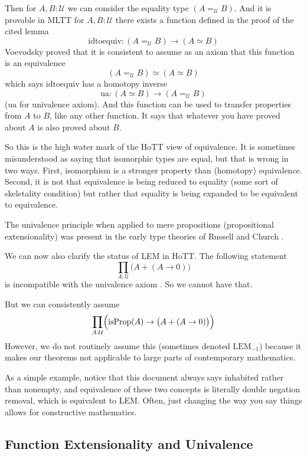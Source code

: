 \documentclass[11pt]{article}
\DeclareMathOperator{\isProp}{isProp}
\newcommand{\universe}{\mathcal{U}}
\begin{document}
Then for $A, B : \universe$ we can consider the equality
type $(A =_\universe B)$.  And it is provable in MLTT
 for $A, B : \universe$ there
exists a function defined in the proof of the cited lemma
$$
   \text{idtoequiv} : (A =_\universe B) \to (A \simeq B)
$$
Voevodsky proved that it is consistent to assume as an axiom that this
function is an equivalence
$$
   (A =_\universe B) \simeq (A \simeq B)
$$
which says $\text{idtoequiv}$ has a homotopy inverse
$$
   \text{ua} : (A \simeq B) \to (A =_\universe B)
$$
($\text{ua}$ for univalence axiom).  And this function can be used to
transfer properties from $A$ to $B$, like any other function.
It says that whatever you have proved about $A$ is also proved about $B$.

So this is the high water mark of the HoTT view of equivalence.  It
is sometimes misunderstood as saying that isomorphic types are equal,
but that is wrong in two ways.  First, isomorphism is a stronger property
than (homotopy) equivalence.  Second, it is not that equivalence is being
reduced to equality (some sort
of skeletality condition) but rather that equality is being expanded to
be equivalent to equivalence.

The univalence principle when applied to mere propositions
(propositional extensionality) was present in the early type theories
of Russell and Church .

We can now also clarify the status of LEM in
HoTT.  The following statement
$$
   \prod_{A : \universe} \bigl(A + (A \to 0)\bigr)
$$
is incompatible with the univalence axiom
.  So we cannot have that.

But we can consistently assume 
$$
   \prod_{A : \universe} \Bigl(\isProp(A) \to \bigl(A + (A \to 0)\bigr)
   \Bigr)
$$
However, we do not routinely assume this (sometimes denoted $\text{LEM}_{-1}$)
because it makes our theorems not applicable to large parts of contemporary
mathematics.

As a simple example, notice that this document always says inhabited rather
than nonempty, and
equivalence of these two concepts is literally double negation removal,
which is equivalent to LEM.  Often, just changing the way you say things
allows for constructive mathematics.

\subsection{Function Extensionality and Univalence}
\end{document}
